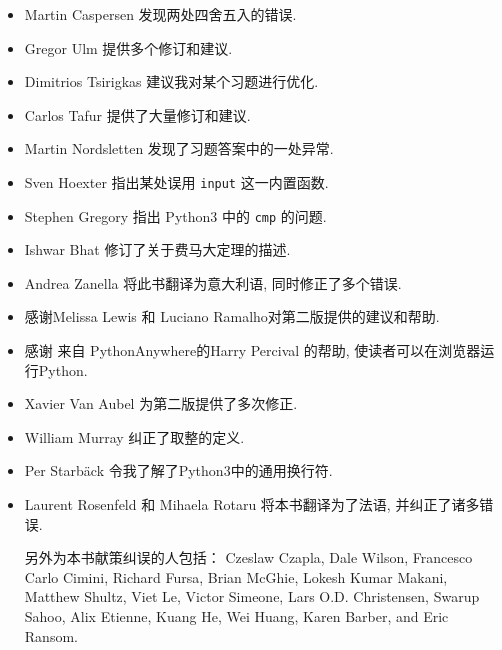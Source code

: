 \documentclass[10pt]{book}
\begin{document}
\begin{itemize}
\item Martin Caspersen 发现两处四舍五入的错误. 

\item Gregor Ulm 提供多个修订和建议. 

\item Dimitrios Tsirigkas 建议我对某个习题进行优化. 

\item Carlos Tafur 提供了大量修订和建议. 

\item Martin Nordsletten 发现了习题答案中的一处异常. 

\item Sven Hoexter 指出某处误用 {\tt input} 这一内置函数. 

\item Stephen Gregory 指出 Python3 中的 {\tt cmp} 的问题. 

\item Ishwar Bhat 修订了关于费马大定理的描述. 

\item Andrea Zanella 将此书翻译为意大利语, 同时修正了多个错误. 


\item 感谢Melissa Lewis 和 Luciano Ramalho对第二版提供的建议和帮助. 

\item 感谢 来自 PythonAnywhere的Harry Percival 的帮助, 使读者可以在浏览器运行Python. 

\item Xavier Van Aubel 为第二版提供了多次修正. 

\item William Murray 纠正了取整的定义. 

\item Per Starb{\"a}ck 令我了解了Python3中的通用换行符. 

\item Laurent Rosenfeld 和 Mihaela Rotaru 将本书翻译为了法语, 并纠正了诸多错误. 


另外为本书献策纠误的人包括：
Czeslaw Czapla, Dale Wilson, Francesco Carlo Cimini,
Richard Fursa, Brian McGhie, Lokesh Kumar Makani, Matthew Shultz, Viet
Le, Victor Simeone, Lars O.D. Christensen, Swarup Sahoo, Alix Etienne,
Kuang He, Wei Huang, Karen Barber, and Eric Ransom. 



\end{itemize}

\normalsize
\clearemptydoublepage
\end{document}
